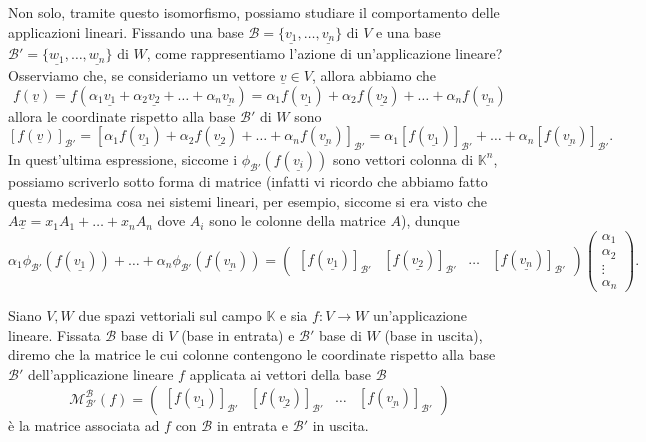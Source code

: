 Non solo, tramite questo isomorfismo, possiamo studiare il comportamento delle applicazioni lineari. Fissando una base $\mathcal{B} = \{ \underline{v_1}, \ldots, \underline{v_n} \}$ di $V$ e una base $\mathcal{B}'=\{ \underline{w_1}, \ldots, \underline{w_n} \}$ di $W$, come rappresentiamo l'azione di un'applicazione lineare?
Osserviamo che, se consideriamo un vettore $\underline{v} \in V$, allora abbiamo che 
$$
f(\underline{v}) = f(\alpha_1 \underline{v_1} + \alpha_2 \underline{v_2} + \ldots + \alpha_n \underline{v_n}) = \alpha_1 f(\underline{v_1}) + \alpha_2 f(\underline{v_2}) + \ldots + \alpha_n f(\underline{v_n})
$$
allora le coordinate rispetto alla base $\mathcal{B}'$ di $W$ sono
$$
[f(\underline{v})]_\mathcal{B'} = [\alpha_1 f(\underline{v_1}) + \alpha_2 f(\underline{v_2}) + \ldots + \alpha_n f(\underline{v_n})]_\mathcal{B'} = \alpha_1 [f(\underline{v_1})]_\mathcal{B'} + \ldots + \alpha_n [f(\underline{v_n})]_\mathcal{B'}.
$$
In quest'ultima espressione, siccome i $\phi_{\mathcal{B}'}(f(\underline{v_i}))$ sono vettori colonna di $\mathbb{K}^n$, possiamo scriverlo sotto forma di matrice (infatti vi ricordo che abbiamo fatto questa medesima cosa nei sistemi lineari, per esempio, siccome si era visto che $A\underline{x} = x_1 A_1 + \ldots + x_n A_n$ dove $A_i$ sono le colonne della matrice $A$), dunque
$$
  \alpha_1 \phi_{\mathcal{B}'}(f(\underline{v_1})) + \ldots + \alpha_n \phi_{\mathcal{B}'}(f(\underline{v_n})) = \left(
\begin{array}{c|c|c|c}
    [f(\underline{v_1})]_\mathcal{B'} &
    [f(\underline{v_2})]_\mathcal{B'} &
    \ldots &
    [f(\underline{v_n})]_\mathcal{B'}
\end{array}
\right)
\begin{pmatrix}
    \alpha_1 \\
    \alpha_2 \\
    \vdots \\
    \alpha_n
  \end{pmatrix}.
$$
\begin{definition}
  Siano $V, W$ due spazi vettoriali sul campo $\mathbb{K}$ e sia $f: V \to W$ un'applicazione lineare. Fissata $\mathcal{B}$ base di $V$ (base in entrata) e $\mathcal{B}'$ base di $W$ (base in uscita), diremo che la matrice le cui colonne contengono le coordinate rispetto alla base $\mathcal{B}'$ dell'applicazione lineare $f$ applicata ai vettori della base $\mathcal{B}$
  $$
    \mathcal{M}_{\mathcal{B}'}^{\mathcal{B}}(f) = 
    \left( \begin{array}{c|c|c|c}
    [f(\underline{v_1})]_\mathcal{B'} &
    [f(\underline{v_2})]_\mathcal{B'} &
    \ldots &
    [f(\underline{v_n})]_\mathcal{B'}
\end{array} \right)
  $$
  è la matrice associata ad $f$ con $\mathcal{B}$ in entrata e $\mathcal{B}'$ in uscita.
\end{definition}

